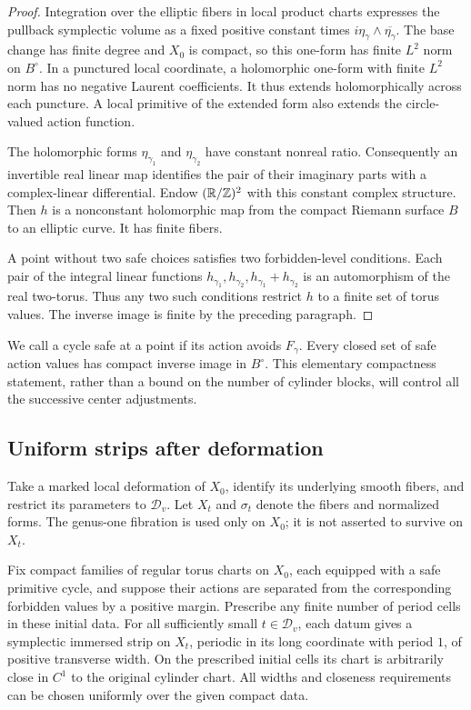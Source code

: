 \begin{proof}
Integration over the elliptic fibers in local product charts
expresses the pullback symplectic volume as a fixed positive
constant times $i\eta_\gamma\wedge\overline{\eta_\gamma}$.
The base change has finite degree and $X_0$ is compact, so this
one-form has finite $L^2$ norm on $B^\circ$. In a punctured local
coordinate, a holomorphic one-form with finite $L^2$ norm has no
negative Laurent coefficients. It thus extends holomorphically
across each puncture. A local primitive of the extended form
also extends the circle-valued action function.

The holomorphic forms $\eta_{\gamma_1}$ and
$\eta_{\gamma_2}$ have constant nonreal ratio. Consequently an
invertible real linear map identifies the pair of their imaginary
parts with a complex-linear differential. Endow $(\mathbb R/\mathbb Z)^2$ with this
constant complex structure. Then $h$ is a nonconstant holomorphic
map from the compact Riemann surface $B$ to an elliptic curve.
It has finite fibers.

A point without two safe choices satisfies two forbidden-level
conditions. Each pair of the integral linear functions
$h_{\gamma_1},h_{\gamma_2},h_{\gamma_1}+h_{\gamma_2}$ is an
automorphism of the real two-torus. Thus any two such conditions
restrict $h$ to a finite set of torus values. The inverse image is
finite by the preceding paragraph.
\end{proof}

We call a cycle safe at a point if its action avoids $F_\gamma$.
Every closed set of safe action values has compact inverse image
in $B^\circ$. This elementary compactness statement, rather than
a bound on the number of cylinder blocks, will control all the
successive center adjustments.

\subsection{Uniform strips after deformation}

Take a marked local deformation of $X_0$, identify its underlying
smooth fibers, and restrict its parameters to $\mathcal D_v$.
Let $X_t$ and $\sigma_t$ denote the fibers and normalized forms.
The genus-one fibration is used only on $X_0$; it is not asserted
to survive on $X_t$.

\begin{lemma}\label{rat:strips}
Fix compact families of regular torus charts on $X_0$, each
equipped with a safe primitive cycle, and suppose their actions
are separated from the corresponding forbidden values by a
positive margin. Prescribe any finite number of period cells in
these initial data. For all sufficiently small $t\in\mathcal D_v$,
each datum gives a symplectic immersed strip on $X_t$, periodic in
its long coordinate with period $1$, of positive transverse width.
On the prescribed initial cells its chart is arbitrarily close in
$C^1$ to the original cylinder chart. All widths and closeness
requirements can be chosen uniformly over the given compact data.
\end{lemma}

